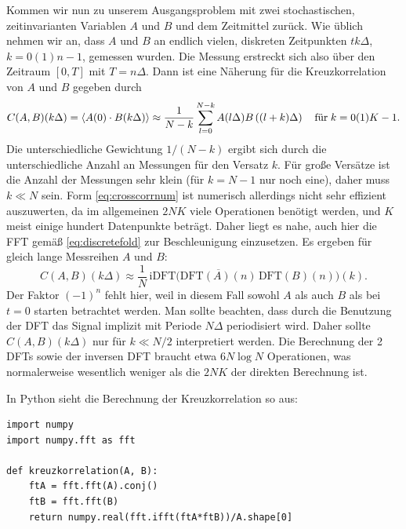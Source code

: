 Kommen wir nun zu unserem Ausgangsproblem mit zwei stochastischen,
zeitinvarianten Variablen $A$ und $B$ und dem Zeitmittel zurück. Wie
üblich nehmen wir an, dass $A$ und $B$ an endlich vielen, diskreten
Zeitpunkten $tk\Delta$, $k=0(1)n-1$, gemessen wurden. Die Messung
erstreckt sich also über den Zeitraum $[0,T]$ mit $T=n\Delta$. Dann
ist eine Näherung für die Kreuzkorrelation von $A$ und $B$ gegeben
durch
\begin{equation}
  \label{eq:crosscorrnum}
  C(A,B)(k\Delta) = \left\langle{A(0)\cdot B(k\Delta)}\right\rangle
  \approx
  \frac{1}{N-k}\sum_{l=0}^{N-k}A(l\Delta)B\left((l+k)\Delta\right)
  \quad\text{für}\; k=0(1)K-1.
\end{equation}
Die unterschiedliche Gewichtung $1/(N-k)$ ergibt sich durch die
unterschiedliche Anzahl an Messungen für den Versatz $k$. Für große
Versätze ist die Anzahl der Messungen sehr klein (für $k=N-1$ nur noch
eine), daher muss $k \ll N$ sein. Form \eqref{eq:crosscorrnum} ist
numerisch allerdings nicht sehr effizient auszuwerten, da im
allgemeinen $2NK$ viele Operationen benötigt werden, und $K$ meist
einige hundert Datenpunkte beträgt.  Daher liegt es nahe, auch hier
die FFT gemäß \eqref{eq:discretefold} zur Beschleunigung einzusetzen.
Es ergeben für gleich lange Messreihen $A$ und $B$:
\begin{equation}
  \label{eq:crosscorrnumfft}
  C(A,B)(k\Delta)
  \approx
  \frac{1}{N}\,\text{iDFT}
  \bigl(\overline{\text{DFT}(A)(n)}\,\text{DFT}(B)(n)\bigr)(k).
\end{equation}
Der Faktor $(-1)^n$ fehlt hier, weil in diesem Fall sowohl $A$ als
auch $B$ als bei $t=0$ starten betrachtet werden. Man sollte beachten,
dass durch die Benutzung der DFT das Signal implizit mit Periode
$N\Delta$ periodisiert wird. Daher sollte $C(A,B)(k\Delta)$ nur für
$k\ll N/2$ interpretiert werden. Die Berechnung der 2 DFTs sowie der
inversen DFT braucht etwa $6 N\log N$ Operationen, was normalerweise
wesentlich weniger als die $2NK$ der direkten Berechnung ist.

In Python sieht die Berechnung der Kreuzkorrelation so aus:
\begin{lstlisting}
import numpy
import numpy.fft as fft

def kreuzkorrelation(A, B):
    ftA = fft.fft(A).conj()
    ftB = fft.fft(B)
    return numpy.real(fft.ifft(ftA*ftB))/A.shape[0]
\end{lstlisting}

